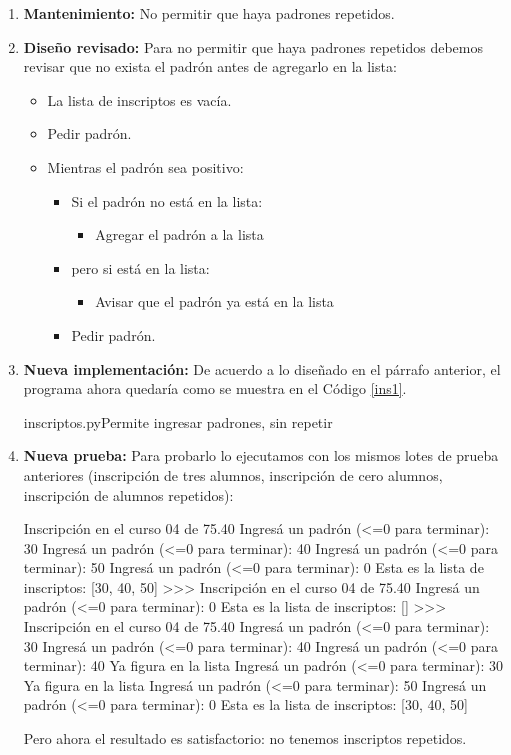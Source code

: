 \begin{enumerate}
\item {\bf Mantenimiento:} No permitir que haya padrones repetidos.

\item {\bf Diseño revisado:} Para no permitir que haya padrones repetidos
debemos revisar que no exista el padrón antes de agregarlo en la lista:

\begin{itemize}
\item La lista de inscriptos es vacía.
\item Pedir padrón.
\item Mientras el padrón sea positivo:
\begin{itemize}
\item Si el padrón no está en la lista:
\begin{itemize}
\item Agregar el padrón a la lista
\end{itemize}
\item pero si está en la lista:
\begin{itemize}
\item Avisar que el padrón ya está en la lista
\end{itemize}
\item Pedir padrón.
\end{itemize}
\end{itemize}

\item {\bf Nueva implementación:}
De acuerdo a lo diseñado en el párrafo anterior, el programa ahora quedaría
como se muestra en el Código \ref{ins1}.

\begin{codigo}{inscriptos.py}{Permite ingresar padrones, sin repetir} 
\label{ins1}

\end{codigo}

\item {\bf Nueva prueba:}
Para probarlo lo ejecutamos con los mismos lotes de prueba anteriores
(inscripción de tres alumnos, inscripción de cero alumnos, inscripción de
alumnos repetidos):

\begin{codigo-python-sn}
Inscripción en el curso 04 de 75.40
Ingresá un padrón (<=0 para terminar): 30
Ingresá un padrón (<=0 para terminar): 40
Ingresá un padrón (<=0 para terminar): 50
Ingresá un padrón (<=0 para terminar): 0
Esta es la lista de inscriptos:  [30, 40, 50]
>>>
Inscripción en el curso 04 de 75.40
Ingresá un padrón (<=0 para terminar): 0
Esta es la lista de inscriptos:  []
>>>
Inscripción en el curso 04 de 75.40
Ingresá un padrón (<=0 para terminar): 30
Ingresá un padrón (<=0 para terminar): 40
Ingresá un padrón (<=0 para terminar): 40
Ya figura en la lista
Ingresá un padrón (<=0 para terminar): 30
Ya figura en la lista
Ingresá un padrón (<=0 para terminar): 50
Ingresá un padrón (<=0 para terminar): 0
Esta es la lista de inscriptos:  [30, 40, 50]
\end{codigo-python-sn}

Pero ahora el resultado es satisfactorio: no tenemos inscriptos repetidos.

\end{enumerate}

